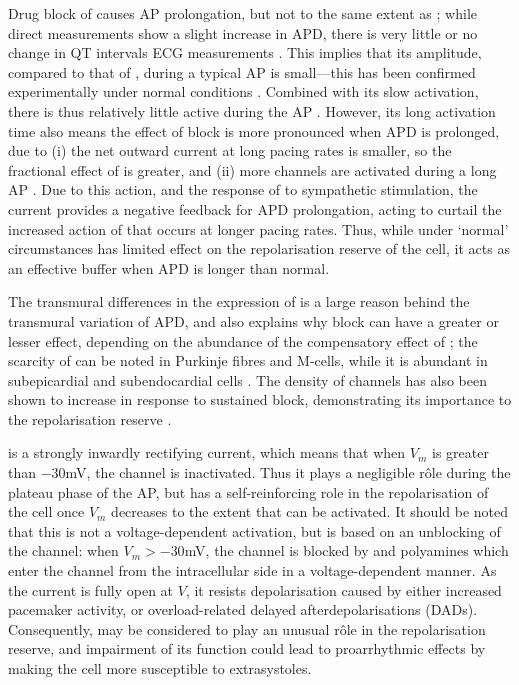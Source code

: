 \documentclass[../thesis-main.tex]{subfiles}
\begin{document}
 Drug block of \iks{} causes AP prolongation, but not to the same extent as \ikr{}; while direct measurements show a slight increase in APD, there is very little or no change in QT intervals ECG measurements \citep{Varro2000, Lengyel2001, Jost2005}. This implies that its amplitude, compared to that of \ikr{}, during a typical AP is small---this has been confirmed experimentally under normal conditions \citep{Varro2011}. Combined with its slow activation, there is thus relatively little \iks{} active during the AP \citep{Jost2005}. However, its long activation time also means the effect of \iks{} block is more pronounced when APD is prolonged, due to (i) the net outward current at long pacing rates is smaller, so the fractional effect of \iks{} is greater, and (ii) more channels are activated during a long AP \citep{Carmeliet2006}. Due to this action, and the response of \iks{} to sympathetic stimulation, the current provides a negative feedback for APD prolongation, acting to curtail the increased action of \ica{} that occurs at longer pacing rates. Thus, while under `normal' circumstances \iks{} has limited effect on the repolarisation reserve of the cell, it acts as an effective buffer when APD is longer than normal.
 
 The transmural differences in the expression of \iks{} is a large reason behind the transmural variation of APD, and also explains why \ikr{} block can have a greater or lesser effect, depending on the abundance of the compensatory effect of \iks; the scarcity of \iks{} can be noted in Purkinje fibres and M-cells, while it is abundant in subepicardial and subendocardial cells \citep{Vandenberg2001, Carmeliet2006}. The density of \iks{} channels has also been shown to increase in response to sustained \ikr{} block, demonstrating its importance to the repolarisation reserve \citep{Xiao2008}.
 
 \ikix{} is a strongly inwardly rectifying \K{} current, which means that when $V_m$ is greater than $-30$mV, the channel is inactivated. Thus it plays a negligible r\^ole during the plateau phase of the AP, but has a self-reinforcing role in the repolarisation of the cell once $V_m$ decreases to the extent that \ikix{} can be activated. It should be noted that this is not a voltage-dependent activation, but is based on an unblocking of the channel: when $V_m > -30$mV, the channel is blocked by \mg{} and polyamines which enter the channel from the intracellular side in a voltage-dependent manner. As the current is fully open at $V$, it resists depolarisation caused by either increased pacemaker activity, or \ca{} overload-related delayed afterdepolarisations (DADs). Consequently, \ikix{} may be considered to play an unusual r\^ole in the repolarisation reserve, and impairment of its function could lead to proarrhythmic effects by making the cell more susceptible to extrasystoles.
 
\end{document}
